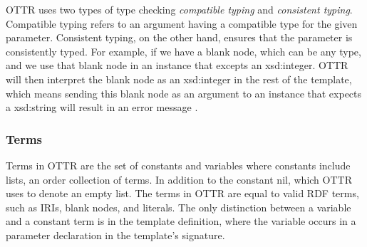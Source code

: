 \para
OTTR uses two types of type checking \emph{compatible typing} and \emph{consistent typing}. Compatible typing refers to an argument having a compatible type for the given parameter. Consistent typing, on the other hand, ensures that the parameter is consistently typed. For example, if we have a blank node, which can be any type, and we use that blank node in an instance that excepts an xsd:integer. OTTR will then interpret the blank node as an xsd:integer in the rest of the template, which means sending this blank node as an argument to an instance that expects a xsd:string will result in an error message \autocite[5-6]{SLKK_OTTR_2021}. 

\subsubsection{Terms}
Terms in OTTR are the set of constants and variables where constants include lists, an order collection of terms. In addition to the constant nil, which OTTR uses to denote an empty list. The terms in OTTR are equal to valid RDF terms, such as IRIs, blank nodes, and literals. The only distinction between a variable and a constant term is in the template definition, where the variable occurs in a parameter declaration in the template's signature.\autocite{OTTR_mOTTR}
